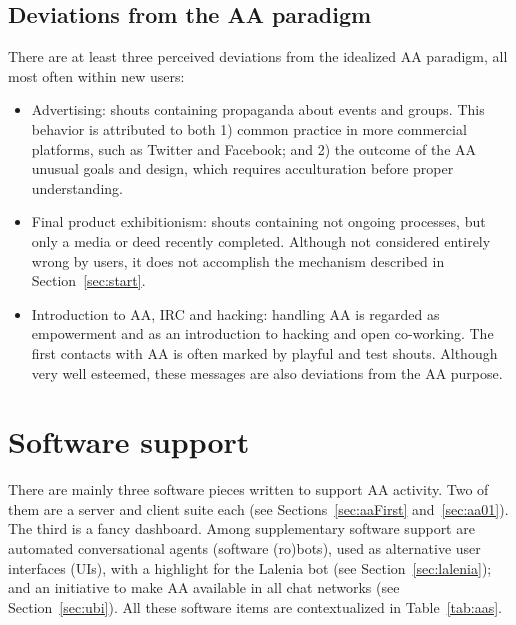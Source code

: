 \documentclass[12pt,fleqn]{article}
\begin{document}
\subsection{Deviations from the AA paradigm}\label{sec:devia}
There are at least three perceived deviations from the idealized AA paradigm,
all most often within new users:
\begin{itemize}
    \item Advertising: shouts containing propaganda about events and groups.
	    This behavior is attributed to both 1) common practice in more commercial platforms,
		such as Twitter and Facebook;
		and 2) the outcome of the AA unusual goals and design,
		which requires acculturation before proper understanding.
    \item Final product exhibitionism: shouts containing not ongoing processes,
	    but only a media or deed recently completed.
		Although not considered entirely wrong by users,
		it does not accomplish the mechanism described in Section~\ref{sec:start}.
    \item Introduction to AA, IRC and hacking:
	    handling AA is regarded as empowerment and as an introduction to hacking and open co-working.
		The first contacts with AA is often marked by playful and test shouts.
		Although very well esteemed, these messages are also deviations from the AA purpose.
\end{itemize}

\section{Software support}\label{sec:sofsup}
There are mainly three software pieces written to support AA activity.
Two of them are a server and client suite each (see Sections~\ref{sec:aaFirst} and~\ref{sec:aa01}).
The third is a fancy dashboard.
Among supplementary software support are automated conversational agents (software (ro)bots),
used as alternative user interfaces (UIs),
with a highlight for the Lalenia bot (see Section~\ref{sec:lalenia});
and an initiative to make AA available in all chat networks (see Section~\ref{sec:ubi}).
All these software items are contextualized in Table~\ref{tab:aas}.
\end{document}
